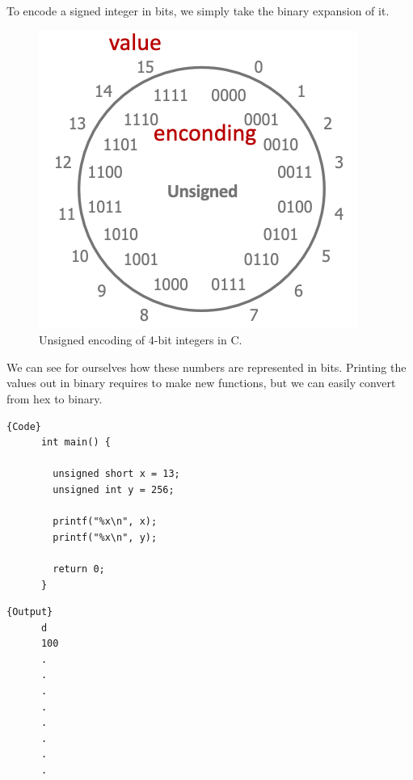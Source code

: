   \begin{theorem}
    To encode a signed integer in bits, we simply take the binary expansion of it. 
    \begin{figure}[H]
      \centering 
      \includegraphics[scale=0.4]{img/unsigned_encoding.png}
      \caption{Unsigned encoding of 4-bit integers in C. } 
      \label{fig:unsigned_encoding}
    \end{figure}
  \end{theorem}

  \begin{example}
    We can see for ourselves how these numbers are represented in bits. Printing the values out in binary requires to make new functions, but we can easily convert from hex to binary. 

    \noindent\begin{minipage}{.5\textwidth}
    \begin{lstlisting}[]{Code}
      int main() { 

        unsigned short x = 13; 
        unsigned int y = 256;

        printf("%x\n", x);
        printf("%x\n", y);

        return 0; 
      }
    \end{lstlisting}
    \end{minipage}
    \hfill
    \begin{minipage}{.49\textwidth}
    \begin{lstlisting}[]{Output}
      d
      100 
      .
      .
      .
      .
      .
      .
      .
      .
    \end{lstlisting}
    \end{minipage}
  \end{example}


